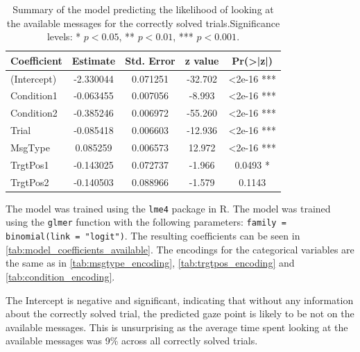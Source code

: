 \begin{table}[h!]
\centering
\begin{tabular}{|l|c|c|c|c|}
\hline
\textbf{Coefficient} & \textbf{Estimate} & \textbf{Std. Error} & \textbf{z value} & \textbf{Pr(>|z|)} \\ \hline
(Intercept)          & -2.330044         & 0.071251            & -32.702          & <2e-16 ***        \\ \hline
Condition1           & -0.063455         & 0.007056            & -8.993           & <2e-16 ***        \\ \hline
Condition2           & -0.385246         & 0.006972            & -55.260          & <2e-16 ***        \\ \hline
Trial                & -0.085418         & 0.006603            & -12.936          & <2e-16 ***        \\ \hline
MsgType             & 0.085259          & 0.006573            & 12.972           & <2e-16 ***        \\ \hline
TrgtPos1             & -0.143025         & 0.072737            & -1.966           & 0.0493 *          \\ \hline
TrgtPos2             & -0.140503         & 0.088966            & -1.579           & 0.1143            \\ \hline
\end{tabular}
\caption{Summary of the model predicting the likelihood of looking at the available messages for the correctly solved trials.Significance levels: * $p < 0.05$, ** $p < 0.01$, *** $p < 0.001$.}
\label{tab:model_coefficients_available}
\end{table}

The model was trained using the \texttt{lme4} package in R. The model was trained using the \texttt{glmer} function with the following parameters: \texttt{family = binomial(link = "logit")}. The resulting coefficients can be seen in \autoref{tab:model_coefficients_available}. The encodings for the categorical variables are the same as in \autoref{tab:msgtype_encoding}, \autoref{tab:trgtpos_encoding} and \autoref{tab:condition_encoding}.

The Intercept is negative and significant, indicating that without any information about the correctly solved trial, the predicted gaze point is likely to be not on the available messages. This is unsurprising as the average time spent looking at the available messages was 9\% across all correctly solved trials. 

